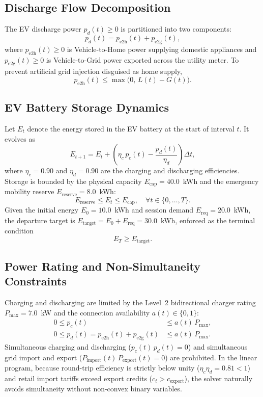 \documentclass[conference]{IEEEtran}
\begin{document}
\subsection{Discharge Flow Decomposition}
The EV discharge power $p_d(t) \ge 0$ is partitioned into two components:
\begin{equation}
p_d(t) = p_{\text{e2h}}(t) + p_{\text{e2g}}(t),
\end{equation}
where $p_{\text{e2h}}(t) \ge 0$ is Vehicle-to-Home power supplying domestic appliances and $p_{\text{e2g}}(t) \ge 0$ is Vehicle-to-Grid power exported across the utility meter. To prevent artificial grid injection disguised as home supply,
\begin{equation}
p_{\text{e2h}}(t) \le \max\bigl(0,\, L(t) - G(t)\bigr).
\end{equation}

\subsection{EV Battery Storage Dynamics}
Let $E_t$ denote the energy stored in the EV battery at the start of interval $t$. It evolves as
\begin{equation}
E_{t+1} = E_t + \left( \eta_c\, p_c(t) - \frac{p_d(t)}{\eta_d} \right) \Delta t,
\end{equation}
where $\eta_c = 0.90$ and $\eta_d = 0.90$ are the charging and discharging efficiencies. Storage is bounded by the physical capacity $E_{\text{cap}} = 40.0$~kWh and the emergency mobility reserve $E_{\text{reserve}} = 8.0$~kWh:
\begin{equation}
E_{\text{reserve}} \le E_t \le E_{\text{cap}}, \quad \forall t \in \{0, \dots, T\}.
\end{equation}
Given the initial energy $E_0 = 10.0$~kWh and session demand $E_{\text{req}} = 20.0$~kWh, the departure target is $E_{\text{target}} = E_0 + E_{\text{req}} = 30.0$~kWh, enforced as the terminal condition
\begin{equation}
E_T \ge E_{\text{target}}.
\end{equation}

\subsection{Power Rating and Non-Simultaneity Constraints}
Charging and discharging are limited by the Level~2 bidirectional charger rating $P_{\max} = 7.0$~kW and the connection availability $a(t) \in \{0, 1\}$:
\begin{align}
0 \le p_c(t) &\le a(t)\, P_{\max}, \\
0 \le p_d(t) = p_{\text{e2h}}(t) + p_{\text{e2g}}(t) &\le a(t)\, P_{\max}.
\end{align}
Simultaneous charging and discharging ($p_c(t)\, p_d(t) = 0$) and simultaneous grid import and export ($P_{\text{import}}(t)\, P_{\text{export}}(t) = 0$) are prohibited. In the linear program, because round-trip efficiency is strictly below unity ($\eta_c \eta_d = 0.81 < 1$) and retail import tariffs exceed export credits ($c_t > c_{\text{export}}$), the solver naturally avoids simultaneity without non-convex binary variables.
\end{document}
